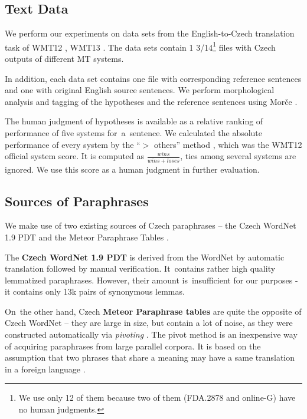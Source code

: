 \documentclass[11pt]{article}
\def\Tref#1{Table~\ref{#1}}
\begin{document}
\subsection{Text Data}
We perform our experiments on data sets from the English-to-Czech translation 
task of WMT12 \cite{wmt12}, WMT13 \cite{wmt13}. The data sets contain 1
3/14\footnote{We use only 12 of them because two of them 
(FDA.2878 and online-G) have no human judgments.} files with Czech outputs 
of different MT systems.

In addition, each data set contains one file with corresponding reference 
sentences and one with original English source sentences. We perform 
morphological analysis and tagging of the hypotheses and the reference 
sentences using Morče \cite{morce:2007}.

The human judgment of hypotheses is available as a relative ranking of 
performance of five systems for~a~sentence. We calculated the absolute 
performance of every system by the “$ > $ others” method \cite{bojar-grains}, 
which was the WMT12 official system score. It is computed as 
$ \frac{wins}{wins+loses} $, ties among several systems are ignored. We use 
this score as a human judgment in further evaluation.

\subsection{Sources of Paraphrases}
\label{meteori}
We make use of two existing sources of Czech paraphrases -- the Czech WordNet 
1.9 PDT \cite{czech-wordnet} and the Meteor Paraphrase Tables \cite{meteor-tables}. 

The \textbf{Czech WordNet 1.9 PDT} is derived from the WordNet \cite{wordnet} 
by automatic translation followed by manual verification. It~contains rather 
high quality lemmatized paraphrases. However, their amount is~insufficient for 
our purposes - it contains only 13k pairs of synonymous lemmas. %

On~the other hand, Czech \textbf{Meteor Paraphrase tables} are quite the 
opposite of Czech WordNet -- they are large in size, but contain a lot of 
noise, as they were constructed automatically via \textit{pivoting} 
\cite{pivoting}. The pivot method is an inexpensive way of acquiring paraphrases 
from large parallel corpora. It is based on the assumption that two phrases 
that share a meaning may have a same translation in a foreign language 
\cite{dyvik}.
\end{document}
